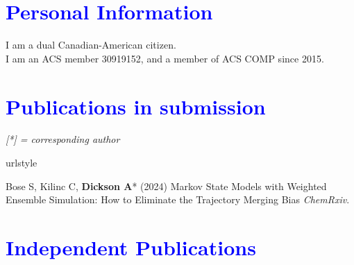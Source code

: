 \documentclass[margin,line]{res}
\begin{document}
\begin{resume}
\section{\sc \textcolor{blue}{ Personal Information}}
I am a dual Canadian-American citizen.\\
I am an ACS member 30919152, and a member of ACS COMP since 2015.

\newpage
\section{\sc \textcolor{blue}{Publications in submission}}


\emph{[*] = corresponding author}
\vspace {0.05in}

\begingroup
\begin{spacing}{1.2}
\renewcommand{\section}[2]{}%
\begin{thebibliography}{10}
\providecommand{\url}[1]{\texttt{#1}}
\providecommand{\urlprefix}{URL }
\expandafter\ifx\csname urlstyle\endcsname\relax
  \providecommand{\doi}[1]{doi:\discretionary{}{}{}#1}\else
  \providecommand{\doi}{doi:\discretionary{}{}{}\begingroup
  \urlstyle{rm}\Url}\fi
\providecommand{\bibAnnoteFile}[1]{%
  \IfFileExists{#1}{\begin{quotation}\noindent\textsc{Key:} #1\\
  \textsc{Annotation:}\ \end{quotation}}{}}
\providecommand{\bibAnnote}[2]{%
  \begin{quotation}\noindent\textsc{Key:} #1\\
  \textsc{Annotation:}\ #2\end{quotation}}
\providecommand{\eprint}[2][]{\url{#2}}

\setlength{\itemsep}{0.15in}

  Bose S, Kilinc C, {\bf Dickson A}* (2024) Markov State Models with Weighted Ensemble Simulation: How to Eliminate the Trajectory Merging Bias 
  \newblock \textit{ChemRxiv}. 

\end{thebibliography}
\end{spacing}
\endgroup

\section{\sc \textcolor{blue}{Independent Publications}}


\end{resume}
\end{document}

